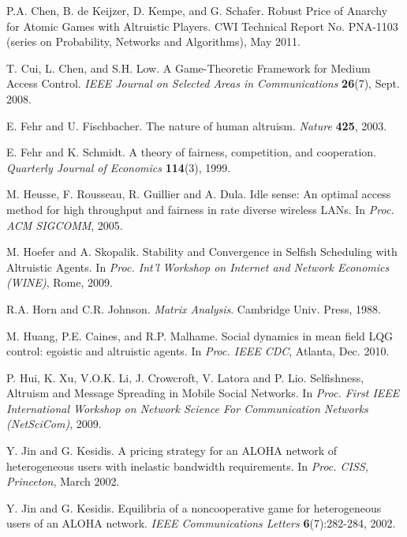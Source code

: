 \documentclass[12pt,onecolumn,draftcls]{IEEEtran}
\begin{document}
\begin{thebibliography}{9}
P.A. Chen, B. de Keijzer, D. Kempe, and G. Schafer.
Robust Price of Anarchy for  Atomic   Games  with Altruistic  Players.
CWI Technical Report No. PNA-1103
(series on Probability, Networks and Algorithms), May 2011.

T. Cui, L. Chen, and S.H. Low.
A Game-Theoretic Framework for Medium Access Control.
{\em IEEE Journal on Selected Areas in Communications}
{\bf 26}(7), Sept. 2008.



E. Fehr and U. Fischbacher.
The nature of human altruism.
{\em Nature} {\bf 425}, 2003.





E. Fehr and K. Schmidt.
A theory of fairness, competition, and cooperation.
{\em Quarterly Journal of Economics}
{\bf 114}(3), 1999.





M. Heusse, F. Rousseau, R. Guillier and A. Dula.
Idle sense: An optimal access method for high throughput and fairness in
rate diverse wireless LANs.
In {\em Proc. ACM SIGCOMM}, 2005.

 M. Hoefer and A. Skopalik.
 Stability and Convergence in Selfish Scheduling with Altruistic Agents. In
{\em Proc. Int'l Workshop on Internet and Network Economics (WINE)},
Rome, 2009.

R.A. Horn and C.R. Johnson.
{\em Matrix Analysis}.  Cambridge Univ. Press, 1988.

M. Huang, P.E. Caines, and R.P. Malhame. Social dynamics in mean 
field LQG control: egoistic and altruistic agents. 
In {\em Proc. IEEE CDC}, Atlanta, Dec. 2010.

P. Hui, K. Xu, V.O.K. Li, J. Crowcroft, V. Latora and P. Lio.
Selfishness, Altruism and Message Spreading in Mobile Social Networks.
In {\em
Proc. First IEEE International Workshop on Network Science 
For Communication Networks (NetSciCom)},
2009.


Y. Jin and G. Kesidis.
A pricing strategy for an {ALOHA} network of heterogeneous users with inelastic bandwidth requirements.
In {\em Proc. CISS, Princeton}, March 2002.

Y. Jin and G. Kesidis.
Equilibria of a noncooperative game for heterogeneous users of an {ALOHA} network.
{\em IEEE Communications Letters} {\bf  6}(7):282-284, 2002.
	



\end{thebibliography}
\end{document}
